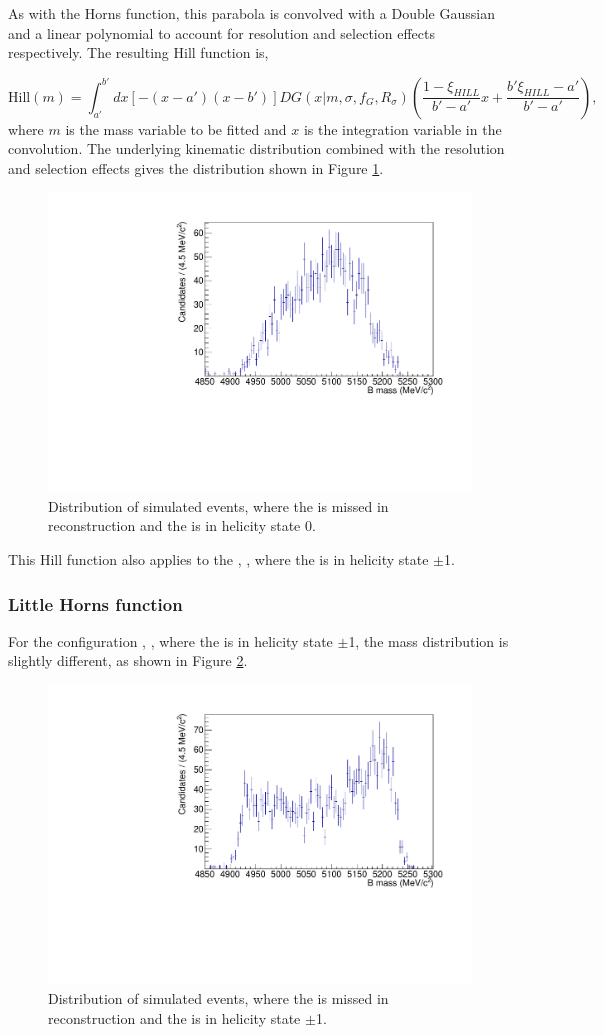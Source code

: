 As with the Horns function, this parabola is convolved with a Double Gaussian and a linear polynomial to account for resolution and selection effects respectively. The resulting Hill function is,

\begin{equation}
\text{Hill}(m) = \int_{a'}^{b'} dx \left[-(x - a')(x - b')\right] DG(x|m,\sigma,f_G,R_{\sigma}) \left( \frac{1 - \xi_{HILL}}{b' - a'}x + \frac{b'\xi_{HILL} - a'}{b' - a'}\right),
\label{eqn:hill}
\end{equation}
where $m$ is the mass variable to be fitted and $x$ is the integration variable in the convolution. The underlying kinematic distribution combined with the resolution and selection effects gives the distribution shown in Figure \ref{fig:hill}.

\begin{figure}[h]
\centering
\includegraphics[width=0.5\linewidth]{figures/fitComponents/hill.pdf}
\caption{Distribution of simulated \decay{\Bm}{(\decay{\Dstarz}{\Dz\gamma})\Kstarm} events, where the \Pgamma is missed in reconstruction and the \Dstarz is in helicity state 0.}
\label{fig:hill}
\end{figure}

This Hill function also applies to the \decay{\Bm}{\Dstarz\Kstarm}, \decay{\Dstarz}{\Dz\piz}, where the \Dstarz is in helicity state $\pm$1.

\subsubsection{Little Horns function}

For the configuration \decay{\Bm}{\Dstarz\Kstarm}, \decay{\Dstarz}{\Dz\gamma}, where the \Dstarz is in helicity state $\pm$1, the \Bm mass distribution is slightly different, as shown in Figure \ref{fig:littlehorns}.

\begin{figure}[h]
\centering
\includegraphics[width=0.5\linewidth]{figures/fitComponents/littlehorns.pdf}
\caption{Distribution of simulated \decay{\Bm}{(\decay{\Dstarz}{\Dz\gamma})\Kstarm} events, where the \Pgamma is missed in reconstruction and the \Dstarz is in helicity state $\pm$1.}
\label{fig:littlehorns}
\end{figure}

